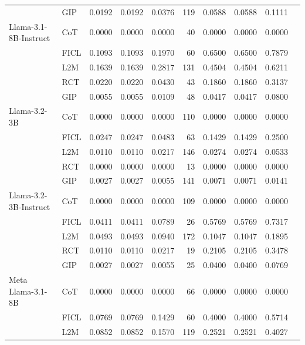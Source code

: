 \documentclass[conference]{IEEEtran}
\begin{document}
\begin{longtable}{p{3.5cm} l r r r r r r r r}
                            & GIP  & 0.0192 & 0.0192 & 0.0376 & 119 & 0.0588 & 0.0588 & 0.1111 \\
Llama-3.1-8B-Instruct       & CoT  & 0.0000 & 0.0000 & 0.0000 & 40  & 0.0000 & 0.0000 & 0.0000 \\
                            & FICL & 0.1093 & 0.1093 & 0.1970 & 60  & 0.6500 & 0.6500 & 0.7879 \\
                            & L2M  & 0.1639 & 0.1639 & 0.2817 & 131 & 0.4504 & 0.4504 & 0.6211 \\
                            & RCT  & 0.0220 & 0.0220 & 0.0430 & 43  & 0.1860 & 0.1860 & 0.3137 \\
                            & GIP  & 0.0055 & 0.0055 & 0.0109 & 48  & 0.0417 & 0.0417 & 0.0800 \\
Llama-3.2-3B                & CoT  & 0.0000 & 0.0000 & 0.0000 & 110 & 0.0000 & 0.0000 & 0.0000 \\
                            & FICL & 0.0247 & 0.0247 & 0.0483 & 63  & 0.1429 & 0.1429 & 0.2500 \\
                            & L2M  & 0.0110 & 0.0110 & 0.0217 & 146 & 0.0274 & 0.0274 & 0.0533 \\
                            & RCT  & 0.0000 & 0.0000 & 0.0000 & 13  & 0.0000 & 0.0000 & 0.0000 \\
                            & GIP  & 0.0027 & 0.0027 & 0.0055 & 141 & 0.0071 & 0.0071 & 0.0141 \\
Llama-3.2-3B-Instruct       & CoT  & 0.0000 & 0.0000 & 0.0000 & 109 & 0.0000 & 0.0000 & 0.0000 \\
                            & FICL & 0.0411 & 0.0411 & 0.0789 & 26  & 0.5769 & 0.5769 & 0.7317 \\
                            & L2M  & 0.0493 & 0.0493 & 0.0940 & 172 & 0.1047 & 0.1047 & 0.1895 \\
                            & RCT  & 0.0110 & 0.0110 & 0.0217 & 19  & 0.2105 & 0.2105 & 0.3478 \\
                            & GIP  & 0.0027 & 0.0027 & 0.0055 & 25  & 0.0400 & 0.0400 & 0.0769 \\
Meta Llama-3.1-8B           & CoT  & 0.0000 & 0.0000 & 0.0000 & 66  & 0.0000 & 0.0000 & 0.0000 \\
                            & FICL & 0.0769 & 0.0769 & 0.1429 & 60  & 0.4000 & 0.4000 & 0.5714 \\
                            & L2M  & 0.0852 & 0.0852 & 0.1570 & 119 & 0.2521 & 0.2521 & 0.4027 \\

\end{longtable}
\end{document}
